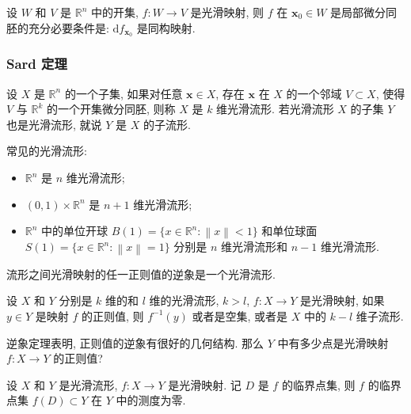 \begin{corollary}
设 \(W\) 和 \(V\) 是 \(\mathbb{R}^n\) 中的开集, \(f:W\to V\) 是光滑映射, 则 \(f\) 在 \(\boldsymbol{x}_0\in W\) 是局部微分同胚的充分必要条件是: \(\mathrm{d}f_{\boldsymbol{x}_0}\) 是同构映射.
\end{corollary}

\subsubsection{Sard 定理}

\begin{definition}
设 \(X\) 是 \(\mathbb{R}^n\) 的一个子集, 如果对任意 \(\boldsymbol{x}\in X\), 存在 \(\boldsymbol{x}\) 在 \(X\) 的一个邻域 \(V\subset X\), 使得 \(V\) 与 \(\mathbb{R}^k\) 的一个开集微分同胚, 则称 \(X\) 是 \(k\) 维光滑流形. 若光滑流形 \(X\) 的子集 \(Y\) 也是光滑流形, 就说 \(Y\) 是 \(X\) 的子流形.
\end{definition}

常见的光滑流形:
\begin{itemize}
    \item \(\mathbb{R}^n\) 是 \(n\) 维光滑流形;
    \item \((0,1)\times\mathbb{R}^n\) 是 \(n+1\) 维光滑流形;
    \item \(\mathbb{R}^n\) 中的单位开球 \(B(1)=\lbrace x\in\mathbb{R}^n: \left\lVert x\right\rVert < 1\rbrace\) 和单位球面 \(S(1)=\lbrace x\in\mathbb{R}^n: \left\lVert x\right\rVert =1\rbrace\) 分别是 \(n\) 维光滑流形和 \(n-1\) 维光滑流形.
\end{itemize}

流形之间光滑映射的任一正则值的逆象是一个光滑流形.

\begin{theorem}[逆象定理]
设 \(X\) 和 \(Y\) 分别是 \(k\) 维的和 \(l\) 维的光滑流形, \(k>l\), \(f:X\to Y\) 是光滑映射, 如果 \(y\in Y\) 是映射 \(f\) 的正则值, 则 \(f^{-1}(y)\) 或者是空集, 或者是 \(X\) 中的 \(k-l\) 维子流形.
\end{theorem}

逆象定理表明, 正则值的逆象有很好的几何结构. 那么 \(Y\) 中有多少点是光滑映射 \(f:X\to Y\) 的正则值?

\begin{theorem}[Sard 定理]
设 \(X\) 和 \(Y\) 是光滑流形, \(f:X\to Y\) 是光滑映射. 记 \(D\) 是 \(f\) 的临界点集, 则 \(f\) 的临界点集 \(f(D)\subset Y\) 在 \(Y\) 中的测度为零.
\end{theorem}
